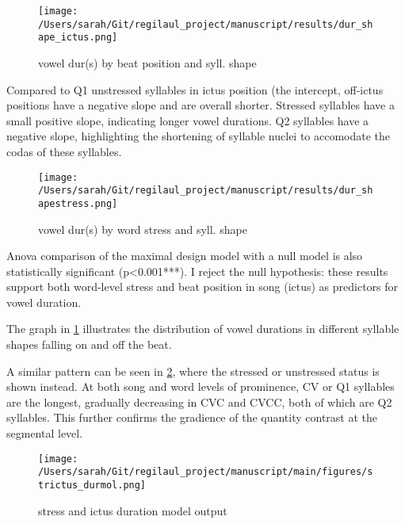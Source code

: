 \begin{figure}[ht]
\centering
\texttt{[image: /Users/sarah/Git/regilaul\_project/manuscript/results/dur\_shape\_ictus.png]}
\caption{vowel dur(s) by beat position and syll. shape}
\label{ickdursh}
\end{figure}

Compared to Q1 unstressed syllables in ictus position (the intercept,  off-ictus positions have a negative slope and are overall shorter. Stressed syllables have a small positive slope, indicating longer vowel durations. Q2 syllables have a negative slope, highlighting the shortening of syllable nuclei to accomodate the codas of these syllables. 


\begin{figure}[ht]
\centering
\texttt{[image: /Users/sarah/Git/regilaul\_project/manuscript/results/dur\_shapestress.png]}
\caption{vowel dur(s) by word stress and syll. shape}
\label{strdursh}

\end{figure}
Anova comparison of the maximal design model with a null model is also statistically significant (p<0.001***). I reject the null hypothesis: these results support both word-level stress and beat position in song (ictus) as predictors for vowel duration. 

The graph in \ref{ickdursh} illustrates the distribution of vowel durations in different syllable shapes falling on and off the beat. 

A similar pattern can be seen in \ref{strdursh}, where the stressed or unstressed status is shown instead. At both song and word levels of prominence, CV or Q1 syllables are the longest, gradually decreasing in CVC and CVCC, both of which are Q2 syllables.  This further confirms the gradience of the quantity contrast at the segmental level. 


\begin{wrapfigure}{L}{0.5\textwidth}
\centering
\texttt{[image: /Users/sarah/Git/regilaul\_project/manuscript/main/figures/strictus\_durmol.png]}

\caption{stress and ictus duration model output}
\label{strickmdl}
\end{wrapfigure}


%

